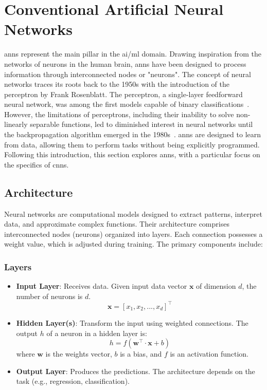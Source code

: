 \section{Conventional Artificial Neural Networks}
\glspl{ann} represent the main pillar in the \gls{ai}/\gls{ml} domain. Drawing inspiration from the networks of neurons in the human brain, \glspl{ann} have been designed to process information through interconnected nodes or "neurons". The concept of neural networks traces its roots back to the 1950s with the introduction of the perceptron by Frank Rosenblatt. The perceptron, a single-layer feedforward neural network, was among the first models capable of binary classifications~\cite{rosenblatt1958perceptron}. However, the limitations of perceptrons, including their inability to solve non-linearly separable functions, led to diminished interest in neural networks until the backpropagation algorithm emerged in the 1980s~\cite{rumelhart1986learning}. \glspl{ann} are designed to learn from data, allowing them to perform tasks without being explicitly programmed. Following this introduction, this section explores \glspl{ann}, with a particular focus on the specifics of \glspl{cnn}.

\subsection{Architecture}

Neural networks are computational models designed to extract patterns, interpret data, and approximate complex functions. Their architecture comprises interconnected nodes (neurons) organized into layers. Each connection possesses a weight value, which is adjusted during training. The primary components include:

\subsubsection{Layers}

\begin{itemize}
	\item \textbf{Input Layer}: Receives data. Given input data vector \( \mathbf{x} \) of dimension \( d \), the number of neurons is \( d \).
	\[
	\mathbf{x} = [x_1, x_2, ..., x_d]^\intercal
	\]
	
	\item \textbf{Hidden Layer(s)}: Transform the input using weighted connections. The output \( h \) of a neuron in a hidden layer is:
	\[
	h = f(\mathbf{w^\intercal} \cdot \mathbf{x} + b)
	\]
	where \( \mathbf{w} \) is the weights vector, \( b \) is a bias, and \( f \) is an activation function.
	
	\item \textbf{Output Layer}: Produces the predictions. The architecture depends on the task (e.g., regression, classification).
\end{itemize}


